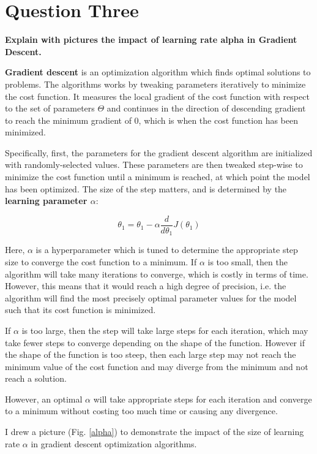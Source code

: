 \documentclass{article}
\begin{document}
\section{Question Three}
\noindent \textbf{Explain with pictures the impact of learning rate alpha in Gradient Descent.}

\textbf{Gradient descent} is an optimization algorithm which finds optimal solutions to problems. The algorithms works by tweaking parameters iteratively to minimize the cost function. It measures the local gradient of the cost function with respect to the set of parameters $\Theta$ and continues in the direction of descending gradient to reach the minimum gradient of 0, which is when the cost function has been minimized.

Specifically, first, the parameters for the gradient descent algorithm are initialized with randomly-selected values. These parameters are then tweaked step-wise to minimize the cost function until a minimum is reached, at which point the model has been optimized. The size of the step matters, and is determined by the \textbf{learning parameter $\alpha$}:

\begin{equation}
    \theta_1 = \theta_1 - \alpha \frac{d}{d \theta_1} J(\theta_1)
\end{equation}

Here, $\alpha$ is a hyperparameter which is tuned to determine the appropriate step size to converge the cost function to a minimum. If $\alpha$ is too small, then the algorithm will take many iterations to converge, which is costly in terms of time. However, this means that it would reach a high degree of precision, i.e. the algorithm will find the most precisely optimal parameter values for the model such that its cost function is minimized.

If $\alpha$ is too large, then the step will take large steps for each iteration, which may take fewer steps to converge depending on the shape of the function. However if the shape of the function is too steep, then each large step may not reach the minimum value of the cost function and may diverge from the minimum and not reach a solution.

However, an optimal $\alpha$ will take appropriate steps for each iteration and converge to a minimum without costing too much time or causing any divergence.

I drew a picture (Fig. \ref{alpha}) to demonstrate the impact of the size of learning rate $\alpha$ in gradient descent optimization algorithms.
\end{document}
